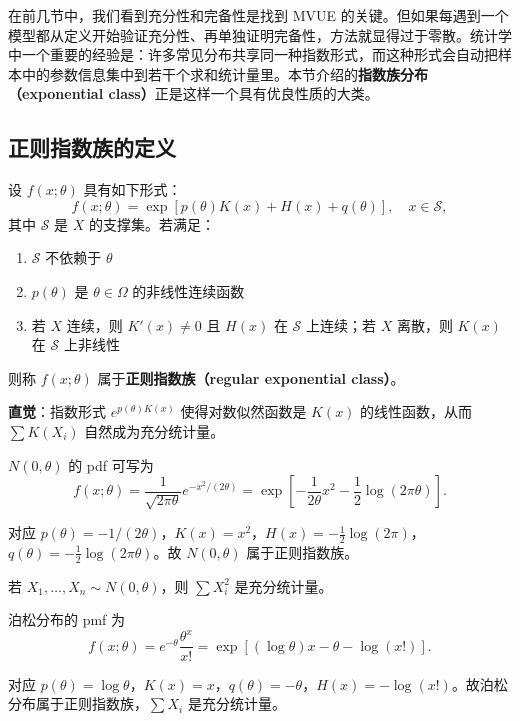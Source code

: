 在前几节中，我们看到充分性和完备性是找到 MVUE 的关键。但如果每遇到一个模型都从定义开始验证充分性、再单独证明完备性，方法就显得过于零散。统计学中一个重要的经验是：许多常见分布共享同一种指数形式，而这种形式会自动把样本中的参数信息集中到若干个求和统计量里。本节介绍的\textbf{指数族分布（exponential class）}正是这样一个具有优良性质的大类。

\subsection{正则指数族的定义}

\begin{definition}[正则指数族]\label{def:regular-exponential}
设 $f(x; \theta)$ 具有如下形式：
\[
f(x; \theta) = \exp[p(\theta)K(x) + H(x) + q(\theta)],\quad x \in \mathcal{S},
\]
其中 $\mathcal{S}$ 是 $X$ 的支撑集。若满足：
\begin{enumerate}
\item $\mathcal{S}$ 不依赖于 $\theta$
\item $p(\theta)$ 是 $\theta \in \Omega$ 的非线性连续函数
\item 若 $X$ 连续，则 $K'(x) \neq 0$ 且 $H(x)$ 在 $\mathcal{S}$ 上连续；若 $X$ 离散，则 $K(x)$ 在 $\mathcal{S}$ 上非线性
\end{enumerate}
则称 $f(x; \theta)$ 属于\textbf{正则指数族（regular exponential class）}。
\end{definition}

\textbf{直觉}：指数形式 $e^{p(\theta)K(x)}$ 使得对数似然函数是 $K(x)$ 的线性函数，从而 $\sum K(X_i)$ 自然成为充分统计量。

\begin{example}\label{ex:normal-exponential}
$N(0, \theta)$ 的 pdf 可写为
\[
f(x; \theta) = \frac{1}{\sqrt{2\pi\theta}} e^{-x^2/(2\theta)} = \exp\left[-\frac{1}{2\theta}x^2 - \frac{1}{2}\log(2\pi\theta)\right].
\]

对应 $p(\theta) = -1/(2\theta)$，$K(x) = x^2$，$H(x) = -\frac{1}{2}\log(2\pi)$，$q(\theta) = -\frac{1}{2}\log(2\pi\theta)$。故 $N(0, \theta)$ 属于正则指数族。

若 $X_1, \ldots, X_n \sim N(0, \theta)$，则 $\sum X_i^2$ 是充分统计量。
\end{example}

\begin{example}[泊松分布是指数族]\label{ex:poisson-exponential}
泊松分布的 pmf 为
\[
f(x; \theta) = e^{-\theta} \frac{\theta^x}{x!} = \exp[(\log\theta)x - \theta - \log(x!)].
\]

对应 $p(\theta) = \log\theta$，$K(x) = x$，$q(\theta) = -\theta$，$H(x) = -\log(x!)$。故泊松分布属于正则指数族，$\sum X_i$ 是充分统计量。
\end{example}

